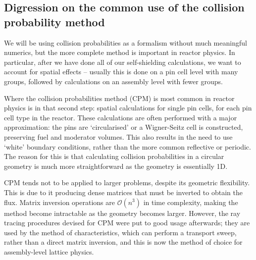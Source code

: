 \subsection{Digression on the common use of the collision probability method}

We will be using collision probabilities as a formalism without much meaningful numerics, but the more complete method is important in reactor physics. In particular, after we have done all of our self-shielding calculations, we want to account for spatial effects -- usually this is done on a pin cell level with many groups, followed by calculations on an assembly level with fewer groups.

Where the collision probabilities method (CPM) is most common in reactor physics is in that second step: spatial calculations for single pin cells, for each pin cell type in the reactor. These calculations are often performed with a major approximation: the pins are `circularised' or a Wigner-Seitz cell is constructed, preserving fuel and moderator volumes. This also results in the need to use `white' boundary conditions, rather than the more common reflective or periodic. The reason for this is that calculating collision probabilities in a circular geometry is much more straightforward as the geometry is essentially 1D.

CPM tends not to be applied to larger problems, despite its geometric flexibility. This is due to it producing dense matrices that must be inverted to obtain the flux. Matrix inversion operations are $\mathcal{O}(n^3)$ in time complexity, making the method become intractable as the geometry becomes larger. However, the ray tracing procedures devised for CPM were put to good usage afterwards; they are used by the method of characteristics, which can perform a transport sweep, rather than a direct matrix inversion, and this is now the method of choice for assembly-level lattice physics.
